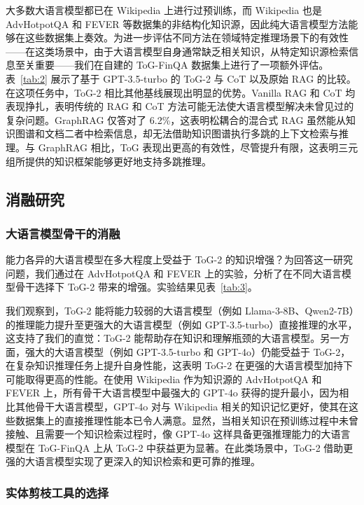 \documentclass[11pt,UTF8,fontset=fandol]{ctexart}
\newcommand{\toctwo}{ToG-2}
\begin{document}
大多数大语言模型都已在 Wikipedia 上进行过预训练，而 Wikipedia 也是 AdvHotpotQA 和 FEVER 等数据集的非结构化知识源，因此纯大语言模型方法能够在这些数据集上奏效。为进一步评估不同方法在领域特定推理场景下的有效性——在这类场景中，由于大语言模型自身通常缺乏相关知识，从特定知识源检索信息至关重要——我们在自建的 ToG-FinQA 数据集上进行了一项额外评估。表~\ref{tab:2} 展示了基于 GPT-3.5-turbo 的 \toctwo{} 与 CoT 以及原始 RAG 的比较。在这项任务中，\toctwo{} 相比其他基线展现出明显的优势。Vanilla RAG 和 CoT 均表现挣扎，表明传统的 RAG 和 CoT 方法可能无法使大语言模型解决未曾见过的复杂问题。GraphRAG 仅答对了 6.2\%，这表明松耦合的混合式 RAG 虽然能从知识图谱和文档二者中检索信息，却无法借助知识图谱执行多跳的上下文检索与推理。与 GraphRAG 相比，ToG 表现出更高的有效性，尽管提升有限，这表明三元组所提供的知识框架能够更好地支持多跳推理。

\subsection{消融研究}
\subsubsection{大语言模型骨干的消融}

能力各异的大语言模型在多大程度上受益于 \toctwo{} 的知识增强？为回答这一研究问题，我们通过在 AdvHotpotQA 和 FEVER 上的实验，分析了在不同大语言模型骨干选择下 \toctwo{} 带来的增强。实验结果见表~\ref{tab:3}。

我们观察到，\toctwo{} 能将能力较弱的大语言模型（例如 Llama-3-8B、Qwen2-7B）的推理能力提升至更强大的大语言模型（例如 GPT-3.5-turbo）直接推理的水平，这支持了我们的直觉：\toctwo{} 能帮助存在知识和理解瓶颈的大语言模型。另一方面，强大的大语言模型（例如 GPT-3.5-turbo 和 GPT-4o）仍能受益于 \toctwo{}，在复杂知识推理任务上提升自身性能，这表明 \toctwo{} 在更强的大语言模型加持下可能取得更高的性能。在使用 Wikipedia 作为知识源的 AdvHotpotQA 和 FEVER 上，所有骨干大语言模型中最强大的 GPT-4o 获得的提升最小，因为相比其他骨干大语言模型，GPT-4o 对与 Wikipedia 相关的知识记忆更好，使其在这些数据集上的直接推理性能本已令人满意。显然，当相关知识在预训练过程中未曾接触、且需要一个知识检索过程时，像 GPT-4o 这样具备更强推理能力的大语言模型在 ToG-FinQA 上从 \toctwo{} 中获益更为显著。在此类场景中，\toctwo{} 借助更强的大语言模型实现了更深入的知识检索和更可靠的推理。

\subsubsection{实体剪枝工具的选择}
\end{document}
